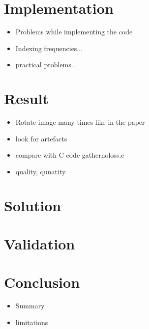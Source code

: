 \documentclass[]{usiinfbachelorproject}
\begin{document}
	\section{Implementation}
	\begin{itemize}
		\item Problems while implementing the code
		\item Indexing frequencies...
		\item practical problems...
	\end{itemize}
	
	\section{Result}
	\begin{itemize}
		\item Rotate image many times like in the paper
		\item look for artefacts
		\item compare with C code gathernoloss.c
		\item quality, qunatity
	\end{itemize}
	
	
	\section{Solution}
	\section{Validation}
	\section{Conclusion}
	\begin{itemize}
		\item Summary
		\item limitations
	\end{itemize}
	
	
	
\end{document}
